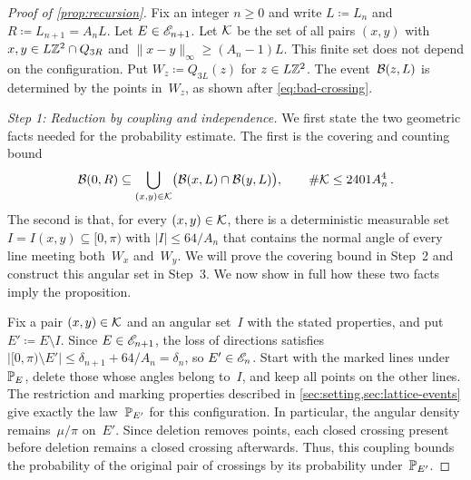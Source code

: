 \documentclass[11pt,letterpaper]{article}
\begin{document}
\begin{proof}[Proof of \cref{prop:recursion}]
Fix an integer $n\ge0$ and write $L\coloneqq L_n$ and $R\coloneqq L_{n+1}=A_nL$. Let $E\in\cE_{n+1}$. Let $\cK$ be the set of all pairs $(x,y)$ with $x,y\in L\Z^2\cap Q_{3R}$ and $\lVert x-y\rVert_\infty\ge(A_n-1)L$. This finite set does not depend on the configuration. Put $W_z\coloneqq Q_{3L}(z)$ for $z\in L\Z^2$. The event~$\cB(z,L)$ is determined by the points in~$W_z$, as shown after \eqref{eq:bad-crossing}.

\emph{Step 1: Reduction by coupling and independence.} We first state the two geometric facts needed for the probability estimate. The first is the covering and counting bound
\begin{equation}\label{eq:recursion-geometric-cover}
  \cB(0,R)\subseteq\bigcup_{(x,y)\in\cK}\bigl(\cB(x,L)\cap\cB(y,L)\bigr),\qquad\#\cK\le2401A_n^4\,.
\end{equation}
The second is that, for every $(x,y)\in\cK$, there is a deterministic measurable set $I=I(x,y)\subseteq[0,\pi)$ with $\lvert I\rvert\le64/A_n$ that contains the normal angle of every line meeting both~$W_x$ and~$W_y$. We will prove the covering bound in Step~2 and construct this angular set in Step~3. We now show in full how these two facts imply the proposition.

Fix a pair $(x,y)\in\cK$ and an angular set~$I$ with the stated properties, and put $E'\coloneqq E\setminus I$. Since $E\in\cE_{n+1}$, the loss of directions satisfies $\lvert[0,\pi)\setminus E'\rvert\le\delta_{n+1}+64/A_n=\delta_n$, so $E'\in\cE_n$. Start with the marked lines under~$\P_E$, delete those whose angles belong to~$I$, and keep all points on the other lines. The restriction and marking properties described in \cref{sec:setting,sec:lattice-events} give exactly the law~$\P_{E'}$ for this configuration. In particular, the angular density remains~$\mu/\pi$ on~$E'$. Since deletion removes points, each closed crossing present before deletion remains a closed crossing afterwards. Thus, this coupling bounds the probability of the original pair of crossings by its probability under~$\P_{E'}$.


\end{proof}
\end{document}
